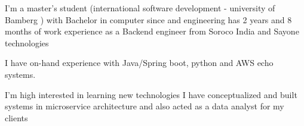 %
%
%
\par{
    I'm a master's student (international software development - university of Bamberg ) with Bachelor in computer since and engineering has 2 years and 8 months of work experience as a Backend engineer from Soroco India and Sayone technologies 

    I have on-hand experience with Java/Spring boot, python and AWS echo systems.
    
    I'm high interested in learning new technologies I have conceptualized and built systems in microservice architecture and also acted as a data analyst for my clients 
}